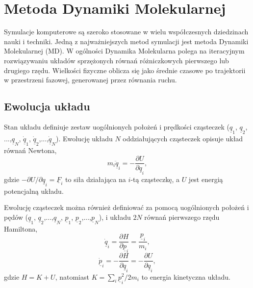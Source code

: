 \documentclass[12pt,a4paper,openright]{report} %
\begin{document}
\chapter{Metoda Dynamiki Molekularnej}
\begin{samepage}
Symulacje komputerowe są szeroko stosowane w wielu współczesnych dziedzinach nauki i techniki. Jedną z najważniejszych metod symulacji jest metoda Dynamiki Molekularnej (MD). 
W ogólności Dynamika Molekularna polega na iteracyjnym rozwiązywaniu układów sprzężonych równań różniczkowych pierwszego lub drugiego rzędu. Wielkości fizyczne oblicza się jako średnie czasowe po trajektorii w przestrzeni fazowej, generowanej przez równania ruchu. 
\section{Ewolucja układu}
Stan układu definiuje zestaw uogólnionych położeń i prędkości cząsteczek ($\underline{q}_1$, $\underline{q}_2$,$...$,$\underline{q}_N$, $\underline{\dot{q}}_1$, $\underline{\dot{q}}_2$,$...$,$\underline{\dot{q}}_N$). Ewolucję układu $N$ oddziałujących cząsteczek opisuje układ równań Newtona,
\begin{equation}
m_i \underline{\ddot{q}}_i=-\frac{\partial U}{\partial \underline{q}_i},
\label{rownania_newtona}
\end{equation}
gdzie $-{\partial U}/{\partial \underline{q}_i} = \underline{F}_i$ to siła działająca na $i$-tą cząsteczkę, a $U$ jest energią potencjalną układu.
\end{samepage}
%
\newpage
\noindent
%
\begin{samepage}
Ewolucję cząsteczek można również definiować za pomocą uogólnionych położeń i pędów ($\underline{q}_1$, $\underline{q}_2$,$...$,$\underline{q}_N$, $\underline{p}_1$, $\underline{p}_2$,$...$,$\underline{p}_N$), i układu $2 N$ równań pierwszego rzędu Hamiltona, 
\begin{equation}
\dot{\underline{q}}_i = \frac{\partial H}{\partial \underline{p}_i} = \frac{\underline{p}_i}{m_i},
\label{eq:RownHam3}
\end{equation}
\begin{equation}
\dot{\underline{p}}_i=-\frac{\partial H}{\partial \underline{q}_i} = -\frac{\partial U}{\partial \underline{q}_i},
\label{eq:RownHam4}
\end{equation}
gdzie $H=K+U$, natomiast $K=\sum_i \underline{p}^2_i/2m_i$ to energia kinetyczna układu.
\end{samepage}
\end{document}

